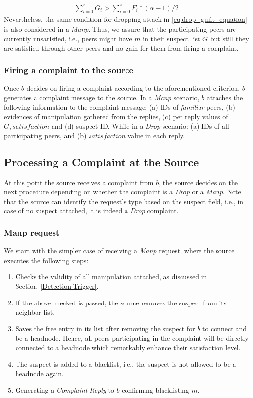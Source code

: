 \begin{align}
\label{eq:drop_guilt_equation}
\sum_{i=0}^{z} G_i > \sum_{i=0}^{z} F_i*(\alpha-1)/2
\end{align}
Nevertheless, the same condition for dropping attack in \ref{eq:drop_guilt_equation} is also considered in a \textit{Manp}.
Thus, we assure that the participating peers are currently unsatisfied, i.e., peers might have $m$ in their suspect list $G$ but still they are satisfied through other peers and no gain for them from firing a complaint.


\subsubsection*{Firing a complaint to the source}

Once $b$ decides on firing a complaint according to the aforementioned criterion, $b$ generates a complaint message to the source.
In a \textit{Manp} scenario, $b$ attaches the following information to the complaint message: (a) IDs of \textit{familiar} peers, (b) evidences of manipulation gathered from the replies, (c) per reply values of $G,satisfaction$ and (d) suspect ID.
While in a \textit{Drop} scenario: (a) IDs of all participating peers, and (b) $satisfaction$ value in each reply.

\subsection{Processing a Complaint at the Source}
\label{complaint_source}
At this point the source receives a complaint from $b$, the source decides on the next procedure depending on whether the complaint is a \textit{Drop} or a \textit{Manp}.
Note that the source can identify the request's type based on the suspect field, i.e., in case of no suspect attached, it is indeed a \textit{Drop} complaint.

\subsubsection*{Manp request}
We start with the simpler case of receiving a \textit{Manp} request, where the source executes the following steps:
\begin{enumerate}
 \item Checks the validity of all manipulation attached, as discussed in Section~\ref{Detection-Trigger}.
 \item If the above checked is passed, the source removes the suspect from its neighbor list.
 \item Saves the free entry in its list after removing the suspect for $b$ to connect and be a headnode. Hence, all peers participating in the complaint will be directly connected to a headnode which remarkably enhance their satisfaction level.
 \item The suspect is added to a blacklist, i.e., the suspect is not allowed to be a headnode again.
 \item Generating a \textit{Complaint Reply} to $b$ confirming blacklisting $m$.
\end{enumerate}

